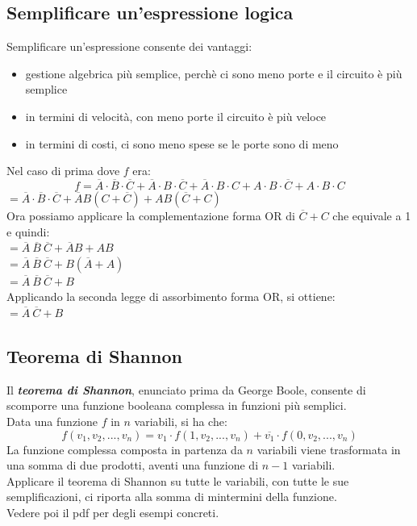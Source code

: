 \documentclass[12pt]{report}
\begin{document}
				\subsection{Semplificare un'espressione logica}
				Semplificare un'espressione consente dei vantaggi:
				\begin{itemize}
					\item gestione algebrica più semplice, perchè ci sono meno porte e il circuito è più semplice
					\item in termini di velocità, con meno porte il circuito è più veloce
					\item in termini di costi, ci sono meno spese se le porte sono di meno
				\end{itemize}
				Nel caso di prima dove $f$ era:
				\[
				f = \overline{A}\cdot\overline{B}\cdot\overline{C} + \overline{A}\cdot B \cdot\overline{C} + \overline{A}\cdot B \cdot C + A \cdot B \cdot\overline{C} + A \cdot B \cdot C
				\]
				$=\overline{A}\cdot\overline{B}\cdot\overline{C} + \overline{A}B(C + \overline{C}) + AB(\overline{C} + C)$ \\
				Ora possiamo applicare la complementazione forma OR di $\overline{C} + C$ che equivale a 1 e quindi: \\
				$=\overline{A}\ \overline{B}\ \overline{C} + \overline{A}B + AB$ \\
				$=\overline{A}\ \overline{B}\ \overline{C} + B(\overline{A} + A)$ \\
				$=\overline{A}\ \overline{B}\ \overline{C} + B$ \\
				Applicando la seconda legge di assorbimento forma OR, si ottiene: \\
				$=\overline{A}\ \overline{C} + B$
				\subsection{Teorema di Shannon}
				Il \textbf{\textit{teorema di Shannon}}, enunciato prima da George Boole, consente di scomporre una funzione booleana complessa in funzioni più semplici. \\
				Data una funzione $f$ in $n$ variabili, si ha che:
				\[
				f(v_1, v_2, ..., v_n) = v_1 \cdot f(1, v_2, ..., v_n) + \overline{v_1} \cdot f(0, v_2, ..., v_n)
				\]
				La funzione complessa composta in partenza da $n$ variabili viene trasformata in una somma di due prodotti, aventi una funzione di $n - 1$ variabili. \\
				Applicare il teorema di Shannon su tutte le variabili, con tutte le sue semplificazioni, ci riporta alla somma di mintermini della funzione. \\
				Vedere poi il pdf per degli esempi concreti.
\end{document}
